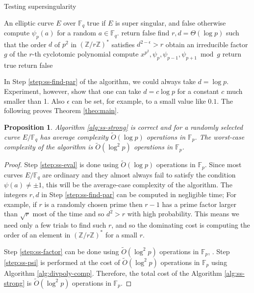 \documentclass[review]{elsarticle}
\theoremstyle{plain}
\newtheorem{proposition}[theorem]{Proposition}
\theoremstyle{definition}
\newcommand{\tildO}{\tilde{O}}
\def\Z{\ensuremath{\mathbb{Z}}}
\def\F{\ensuremath{\mathbb{F}}}
\begin{document}
\begin{algorithm}[H]
	\caption{Testing supersingularity}
	\label{alg:ss-strong}
	\begin{algorithmic}[1]
		\REQUIRE An elliptic curve $E$ over $\F_q$
		\ENSURE true if $E$ is super singular, and false otherwise
		\STATE\label{step:ss-eval}
		compute $\psi_p(a)$ for a random $a \in \F_q$.
			\STATE return false
		\ENDIF
		\STATE\label{step:ss-find-par}
		find $r, d = \Theta(\log p)$ such that the order $d$ of $p^2$ in $(\Z/r\Z)^*$ satisfies 
		$d^{2 - \epsilon} > r$
		\STATE\label{step:ss-factor}
		obtain an irreducible factor $g$ of the $r$-th cyclotomic polynomial
		\STATE\label{step:ss-psi}
		compute $x^{p^2}, \psi_p, \psi_{p - 1}, \psi_{p + 1} \bmod g$
			\STATE return true
		\ELSE
			\STATE return false
		\ENDIF
	\end{algorithmic}
\end{algorithm}

In Step \ref{step:ss-find-par} of the algorithm, we could always take $d = \log p$. Experiment, 
however, show that one can take $d = c\log p$ for a constant $c$ much smaller than 1. Also 
$\epsilon$ can be set, for example, to a small value like $0.1$. The following proves Theorem 
\ref{theo:main}.
\begin{proposition}
	\label{prop:ss-strong}
	Algorithm \ref{alg:ss-strong} is correct and for a randomly selected curve $E/\F_q$ has average 
	complexity $\tildO(\log p)$ operations in $\F_p$. The worst-case complexity of the algorithm is 
	$\tildO(\log^2 p)$ operations in $\F_p$.
\end{proposition}
\begin{proof}
	Step \ref{step:ss-eval} is done using $\tildO(\log p)$ operations in $\F_p$. Since most curves 
	$E/\F_q$ are ordinary and they almost always fail to satisfy the condition $\psi(a) \ne \pm 1$, 
	this will be the average-case complexity of the algorithm. The integers $r, d$ in Step 
	\ref{step:ss-find-par} can be computed in negligible time; For example, if $r$ is a randomly 
	chosen prime then $r - 1$ has a prime factor larger than $\sqrt{r}$ most of the time and so 
	$d^2 > r$ with high probability. This means we need only a few trials to find such $r$, and so 
	the dominating cost is computing the order of an element in $(\Z/r\Z)^*$ for a small $r$.
	
	Step \ref{step:ss-factor} can be done using $\tildO(\log^2 	p)$ operations in $\F_p$, 
	\cite{shoup1994}. Step \ref{step:ss-psi} is performed at the cost of $\tildO(\log^2 p)$ 
	operations in $\F_p$ using Algorithm \ref{alg:divpoly-comp}. Therefore, the total cost of the 
	Algorithm \ref{alg:ss-strong} is $\tildO(\log^2 p)$ operations in $\F_p$.
\end{proof}
\end{document}
